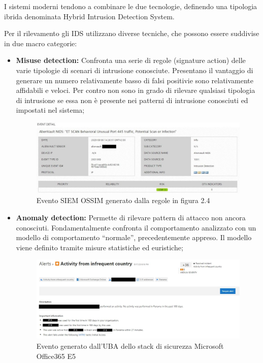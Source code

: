 \newpage

I sistemi moderni tendono a combinare le due tecnologie, definendo una tipologia ibrida denominata Hybrid Intrusion Detection System.\par
Per il rilevamento gli IDS utilizzano diverse tecniche, che possono essere suddivise in due macro categorie:


\begin{itemize}
    \item\textbf{Misuse detection:} Confronta una serie di regole (signature action) delle varie tipologie di scenari di intrusione conosciute.
    Presentano il vantaggio di generare un numero relativamente basso di falsi positivie sono relativamente affidabili e veloci. Per contro non sono in grado di rilevare qualsiasi tipologia di intrusione se essa non è presente nei patterni di intrusione conosciuti ed impostati nel sistema;

    \begin{figure}[h]
    \begin{center}
    \includegraphics[width=0.95\columnwidth]{images/2_architettura_img/OSSIMEvent.jpg}
    \end{center}
    \caption{Evento SIEM OSSIM generato dalla regole in figura 2.4}
    \label{fig:Evento SIEM OSSIM generato dalla regole sopracitata}
    \end{figure}
    
    \item\textbf{Anomaly detection:} Permette di rilevare pattern di attacco non ancora conosciuti. Fondamentalmente confronta il comportamento analizzato con un modello di comportamento “normale”, precedentemente appreso. Il modello viene definito tramite misure statistiche ed euristiche;
    
    \begin{figure}[h]
    \begin{center}
    \includegraphics[width=0.95\columnwidth]{images/2_architettura_img/impossibleTravel.png}
    \end{center}
    \caption{Evento generato dall’UBA dello stack di sicurezza Microsoft Office365 E5}
    \label{fig:Evento generato dall’UBA dello stack di sicurezza Microsoft Office365 E5}
    \end{figure}


\end{itemize}

